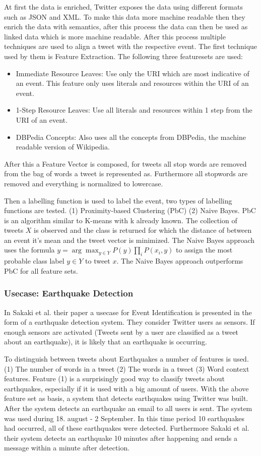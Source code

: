\documentclass{article}
\begin{document}
At first the data is enriched, Twitter exposes the data using different formats such as JSON and XML. To make this data more machine readable then they enrich the data with semantics, after this process the data can then  be used as linked data which is more machine readable. After this process multiple techniques are used to align a tweet with the respective event. The first technique used by them is Feature Extraction. \cite{eventalign} The following three featuresets are used:
\begin{itemize}

  \item Immediate Resource Leaves: Use only the URI which are most indicative of an event. This feature only uses literals and resources within the URI of an event. 
  \item 1-Step Resource Leaves: Use all literals and resources within 1 step from the URI of an event. 
  \item DBPedia Concepts: Also uses all the concepts from DBPedia, the machine readable version of Wikipedia.
\end{itemize}
After this a Feature Vector is composed, for tweets all stop words are removed from the bag of words a tweet is represented as. Furthermore all stopwords are removed and everything is normalized to lowercase. \cite{eventalign} 

Then a labelling function is used to label the event, two types of labelling functions are tested. (1) Proximity-based Clustering (PbC) (2) Naive Bayes. PbC is an algorithm similar to K-means with k already known. The collection of tweets $X$ is observed and the class is returned for which the distance of between an event it's mean and the tweet vector is minimized. The Naive Bayes approach uses the formula $y = \arg\max_{y \in Y} P(y)\prod_i P(x_i, y)$ to assign the most probable class label $y \in Y$ to tweet $x$. The Naive Bayes approach outperforms PbC for all feature sets.  \cite{eventalign}
\subsubsection{Usecase: Earthquake Detection}
In Sakaki et al. their paper a usecase for Event Identification is presented in the form of a earthquake detection system. \cite{earthq} They consider Twitter users as sensors. If enough sensors are activated (Tweets sent by a user are classified as a tweet about an earthquake), it is likely that an earthquake is occurring. 

To distinguish between tweets about Earthquakes a number of features is used. (1) The number of words in a tweet (2) The words in a tweet (3) Word context features. Feature (1) is a surprisingly good way to classify tweets about earthquakes, especially if it is used with a big amount of users. With the above feature set as basis, a system that detects earthquakes using Twitter was built. After the system detects an earthquake an email to all users is sent. The system was used during 18. august - 2 September. In this time period 10 earthquakes had occurred, all of these earthquakes were detected. Furthermore Sakaki et al. their system detects an earthquake 10 minutes after happening and sends a message within a minute after detection. 
\cite{earthq}
\end{document}
